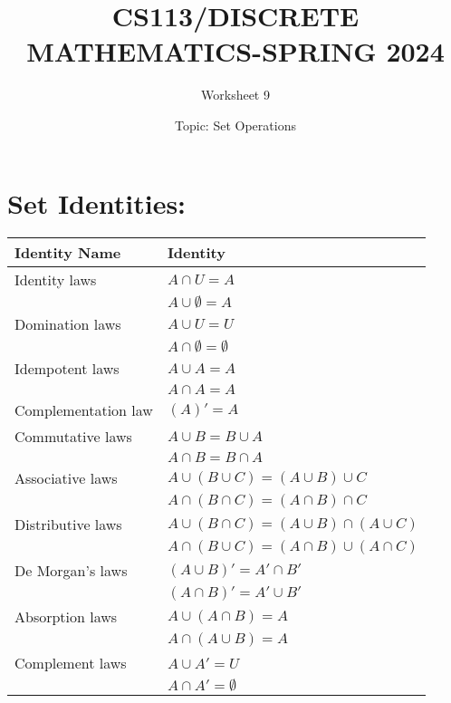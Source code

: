\documentclass{exam}
\title{CS113/DISCRETE MATHEMATICS-SPRING 2024}
\author{Worksheet 9}
\date{Topic: Set Operations}
\begin{document}
\maketitle

\begin{center}
\end{center}

\vspace{5mm}

\vspace{5mm}


\vspace{5mm}
\section{Set Identities:}

\begin{tabular}{|l|l|}
\hline
\textbf{Identity Name} & \textbf{Identity} \\
\hline
Identity laws & $A \cap U = A$ \\
 & $A \cup \emptyset = A$ \\
\hline
Domination laws & $A \cup U = U$ \\
 & $A \cap \emptyset = \emptyset$ \\
\hline
Idempotent laws & $A \cup A = A$ \\
 & $A \cap A = A$ \\
\hline
Complementation law & $(A)' = A$ \\
\hline
Commutative laws & $A \cup B = B \cup A$ \\
 & $A \cap B = B \cap A$ \\
\hline
Associative laws & $A \cup (B \cup C) = (A \cup B) \cup C$ \\
 & $A \cap (B \cap C) = (A \cap B) \cap C$ \\
\hline
Distributive laws & $A \cup (B \cap C) = (A \cup B) \cap (A \cup C)$ \\
 & $A \cap (B \cup C) = (A \cap B) \cup (A \cap C)$ \\
\hline
De Morgan's laws & $(A \cup B)' = A' \cap B'$ \\
 & $(A \cap B)' = A' \cup B'$ \\
\hline
Absorption laws & $A \cup (A \cap B) = A$ \\
 & $A \cap (A \cup B) = A$ \\
\hline
Complement laws & $A \cup A' = U$ \\
 & $A \cap A' = \emptyset$ \\
\hline
\end{tabular}
\end{document}
